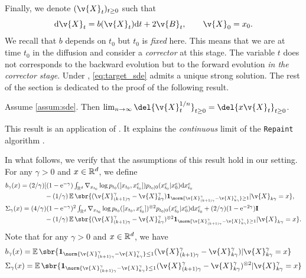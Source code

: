 Finally, we denote $(\v{X}_t)_{t \geq 0}$ such that \begin{equation} \label{eq:target_sde} \mathrm{d} \v{X}_t = b(\v{X}_t) \mathrm{d} t + 2 \v{B}_t , \qquad \v{X}_0 = x_0 .
\end{equation}
We recall that $b$ depends on $t_0$ but $t_0$ is \emph{fixed} here.
This means that we are at time $t_0$ in the diffusion and consider a \emph{corrector} at this stage.
The variable $t$ does not corresponds to the backward evolution but to the forward evolution \emph{in the corrector stage}.
Under , \eqref{eq:target_sde} admits a unique strong solution.
The rest of the section is dedicated to the proof of the following result.

\begin{theorem}
	Assume \cref{assum:sde}. Then \(\lim_{n\to\infty}\del{\v{X}_t^{1/n}}_{t \geq 0} = \del{x\v{X}_t}_{t \geq 0}\).
	\label{thm:convergence_repaint}
\end{theorem}

This result is an application of \textcite[Theorem 11.2.3]{stroock2007multidimensional}.
It explains the \emph{continuous} limit of the \texttt{Repaint} algorithm \cite{lugmayr2022repaint}.

In what follows, we verify that the assumptions of this result hold in our setting.
For any $\gamma > 0$ and $x \in \mathbb{R}^d$, we define \begin{align}  & \textstyle b_\gamma(x) = (2/\gamma)[ (1- \mathrm{e}^{-\gamma}) \int_{\R^d} \nabla_{x_{t_0}} \log p_{t_0}([x_{t_0}, x_{t_0}^c]) p_{t_0|0}(x_{t_0}^c|x_0^c) \mathrm{d} x_{t_0}^c \\ &\qquad \qquad \qquad \textstyle - (1/\gamma) \E\sbr{(\v{X}_{(k+1)\gamma}^\gamma - \v{X}_{k \gamma}^\gamma)\mathbf{1}_{\norm{\v{X}_{(k+1)\gamma}^\gamma - \v{X}_{k \gamma}^\gamma} \geq 1} \vert \v{X}_{k \gamma} = x} , \\ &\textstyle \Sigma_\gamma(x) = (4/\gamma)(1- \mathrm{e}^{-\gamma})^2 \int_{\R^d} \nabla_{x_{t_0}} \log p_{t_0}([x_{t_0}, x_{t_0}^c])^{\otimes 2} p_{t_0|0}(x_{t_0}^c|x_0^c) \mathrm{d} x_{t_0}^c + (2/\gamma)(1- \mathrm{e}^{-2\gamma}) \m{I} \\ &\qquad \qquad \qquad \textstyle - (1/\gamma) \E\sbr{(\v{X}_{(k+1)\gamma}^\gamma - \v{X}_{k \gamma}^\gamma)^{\otimes 2}\mathbf{1}_{\norm{\v{X}_{(k+1)\gamma}^\gamma - \v{X}_{k \gamma}^\gamma} \geq 1} \vert \v{X}_{k \gamma} = x} .
\end{align}
Note that for any $\gamma > 0$ and $x \in \mathbb{R}^d$, we have \begin{align} &b_\gamma(x) = \E\sbr{\mathbf{1}_{\norm{\v{X}_{(k+1)\gamma}^\gamma - \v{X}_{k \gamma}^\gamma}\leq 1} (\v{X}_{(k+1)\gamma}^\gamma - \v{X}_{k \gamma}^\gamma) \vert \v{X}_{k \gamma}^\gamma = x} \\ &\Sigma_\gamma(x) =\E\sbr{\mathbf{1}_{\norm{\v{X}_{(k+1)\gamma}^\gamma - \v{X}_{k \gamma}^\gamma}\leq 1} (\v{X}_{(k+1)\gamma}^\gamma - \v{X}_{k \gamma}^\gamma)^{\otimes 2} \vert \v{X}_{k \gamma}^\gamma = x} \\ \end{align} 

